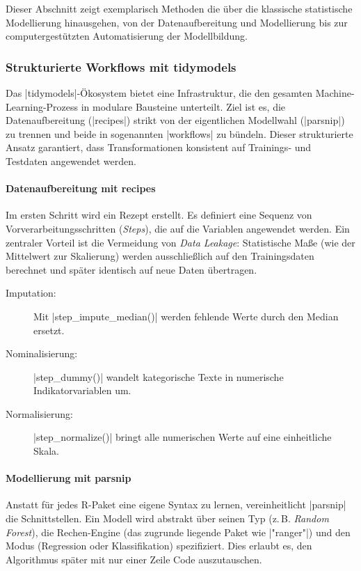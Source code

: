 \documentclass[10pt,twocolumn]{scrartcl}
\renewcommand{\lstinline}{\mycoloredinline}
\begin{document}
Dieser Abschnitt zeigt exemplarisch Methoden die über die klassische statistische Modellierung hinausgehen, von der Datenaufbereitung und Modellierung bis zur computergestützten Automatisierung der Modellbildung.


\subsubsection{Strukturierte Workflows mit tidymodels}

Das \lstinline|tidymodels|-Ökosystem bietet eine Infrastruktur, die den gesamten Machine-Learning-Prozess in modulare Bausteine unterteilt. Ziel ist es, die Datenaufbereitung (\lstinline|recipes|) strikt von der eigentlichen Modellwahl (\lstinline|parsnip|) zu trennen und beide in sogenannten \lstinline|workflows| zu bündeln. Dieser strukturierte Ansatz garantiert, dass Transformationen konsistent auf Trainings- und Testdaten angewendet werden.

\paragraph{Datenaufbereitung mit recipes}

Im ersten Schritt wird ein Rezept erstellt. Es definiert eine Sequenz von Vorverarbeitungsschritten (\emph{Steps}), die auf die Variablen angewendet werden. Ein zentraler Vorteil ist die Vermeidung von \emph{Data Leakage}: Statistische Maße (wie der Mittelwert zur Skalierung) werden ausschließlich auf den Trainingsdaten berechnet und später identisch auf neue Daten übertragen.

\begin{description}
\item[Imputation:] Mit \lstinline|step_impute_median()| werden fehlende Werte durch den Median ersetzt.
\item[Nominalisierung:] \lstinline|step_dummy()| wandelt kategorische Texte in numerische Indikatorvariablen um.
\item[Normalisierung:] \lstinline|step_normalize()| bringt alle numerischen Werte auf eine einheitliche Skala.
\end{description}

\paragraph{Modellierung mit parsnip}

Anstatt für jedes R-Paket eine eigene Syntax zu lernen, vereinheitlicht \lstinline|parsnip| die Schnittstellen. Ein Modell wird abstrakt über seinen Typ (z.\,B. \emph{Random Forest}), die Rechen-Engine (das zugrunde liegende Paket wie \lstinline|"ranger"|) und den Modus (Regression oder Klassifikation) spezifiziert. Dies erlaubt es, den Algorithmus später mit nur einer Zeile Code auszutauschen.
\end{document}
